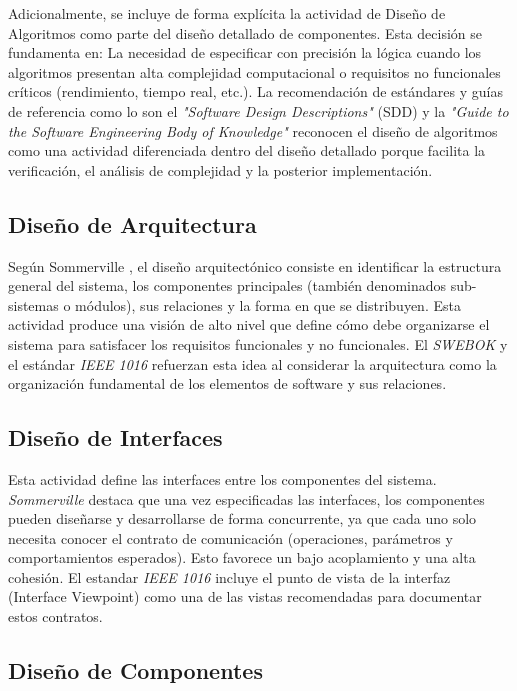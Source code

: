 \documentclass[12pt, letterpaper, oneside]{book}
\begin{document}
Adicionalmente, se incluye de forma explícita la actividad de Diseño de Algoritmos como parte del diseño detallado de componentes. Esta decisión se fundamenta en:
La necesidad de especificar con precisión la lógica cuando los algoritmos presentan alta complejidad computacional o requisitos no funcionales críticos (rendimiento, tiempo real, etc.).
La recomendación de estándares y guías de referencia como lo son el \textit{"Software Design Descriptions"} (SDD) \cite{1016_2009}y la \textit{"Guide to the Software Engineering Body of Knowledge"}  \cite{swebok2024} reconocen el diseño de algoritmos como una actividad diferenciada dentro del diseño detallado porque facilita la verificación, el análisis de complejidad y la posterior implementación.


\subsection{Diseño de Arquitectura}

Según Sommerville \cite{sommerville2011software}, el diseño arquitectónico consiste en identificar la estructura general del sistema, los componentes principales (también denominados sub-sistemas o módulos), sus relaciones y la forma en que se distribuyen. Esta actividad produce una visión de alto nivel que define cómo debe organizarse el sistema para satisfacer los requisitos funcionales y no funcionales. El \textit{SWEBOK} \cite{swebok2024} y el estándar \textit{IEEE 1016} \cite{1016_2009} refuerzan esta idea al considerar la arquitectura como la organización fundamental de los elementos de software y sus relaciones.

\subsection{Diseño de Interfaces}
Esta actividad define las interfaces entre los componentes del sistema. \textit{Sommerville} \cite{Sommerville2015-px} destaca que una vez especificadas las interfaces, los componentes pueden diseñarse y desarrollarse de forma concurrente, ya que cada uno solo necesita conocer el contrato de comunicación (operaciones, parámetros y comportamientos esperados). Esto favorece un bajo acoplamiento y una alta cohesión. El estandar \textit{IEEE 1016}  \cite{1016_2009} incluye el punto de vista de la interfaz (Interface Viewpoint) como una de las vistas recomendadas para documentar estos contratos.


\subsection{Diseño de Componentes}
\end{document}
